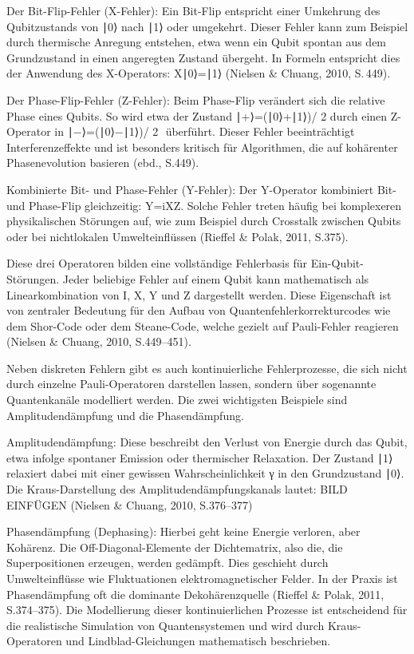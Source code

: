 Der Bit-Flip-Fehler (X-Fehler): Ein Bit-Flip entspricht einer Umkehrung des Qubitzustands von ∣0⟩ nach ∣1⟩ oder umgekehrt. Dieser Fehler kann zum Beispiel durch thermische Anregung entstehen, etwa wenn ein Qubit spontan aus dem Grundzustand in einen angeregten Zustand übergeht. In Formeln entspricht dies der Anwendung des X-Operators: 
X∣0⟩=∣1⟩ (Nielsen & Chuang, 2010, S. 449).

Der Phase-Flip-Fehler (Z-Fehler): Beim Phase-Flip verändert sich die relative Phase eines Qubits. So wird etwa der Zustand 
∣+⟩=(∣0⟩+∣1⟩)/ 
2
​	
  durch einen Z-Operator in  ∣−⟩=(∣0⟩−∣1⟩)/ 2
​	
 überführt. Dieser Fehler beeinträchtigt Interferenzeffekte und ist besonders kritisch für Algorithmen, die auf kohärenter Phasenevolution basieren (ebd., S.449).
 
Kombinierte Bit- und Phase-Fehler (Y-Fehler): Der Y-Operator kombiniert Bit- und Phase-Flip gleichzeitig: Y=iXZ. Solche Fehler treten häufig bei komplexeren physikalischen Störungen auf, wie zum Beispiel durch Crosstalk zwischen Qubits oder bei nichtlokalen Umwelteinflüssen (Rieffel & Polak, 2011, S.375).

Diese drei Operatoren bilden eine vollständige Fehlerbasis für Ein-Qubit-Störungen. Jeder beliebige Fehler auf einem Qubit kann mathematisch als Linearkombination von 
I, X, Y und Z dargestellt werden. Diese Eigenschaft ist von zentraler Bedeutung für den Aufbau von Quantenfehlerkorrekturcodes wie dem Shor-Code oder dem Steane-Code, welche gezielt auf Pauli-Fehler reagieren (Nielsen & Chuang, 2010, S.449–451).


Neben diskreten Fehlern gibt es auch kontinuierliche Fehlerprozesse, die sich nicht durch einzelne Pauli-Operatoren darstellen lassen, sondern über sogenannte Quantenkanäle modelliert werden. Die zwei wichtigsten Beispiele sind Amplitudendämpfung und die Phasendämpfung.

Amplitudendämpfung: Diese beschreibt den Verlust von Energie durch das Qubit, etwa infolge spontaner Emission oder thermischer Relaxation. Der Zustand ∣1⟩ relaxiert dabei mit einer gewissen Wahrscheinlichkeit 
γ in den Grundzustand ∣0⟩. Die Kraus-Darstellung des Amplitudendämpfungskanals lautet:
 BILD EINFÜGEN 
(Nielsen & Chuang, 2010, S.376–377)

Phasendämpfung (Dephasing): Hierbei geht keine Energie verloren, aber Kohärenz. Die Off-Diagonal-Elemente der Dichtematrix, also die, die Superpositionen erzeugen, werden gedämpft. Dies geschieht durch Umwelteinflüsse wie Fluktuationen elektromagnetischer Felder. In der Praxis ist Phasendämpfung oft die dominante Dekohärenzquelle (Rieffel & Polak, 2011, S.374–375).
Die Modellierung dieser kontinuierlichen Prozesse ist entscheidend für die realistische Simulation von Quantensystemen und wird durch Kraus-Operatoren und Lindblad-Gleichungen mathematisch beschrieben.

